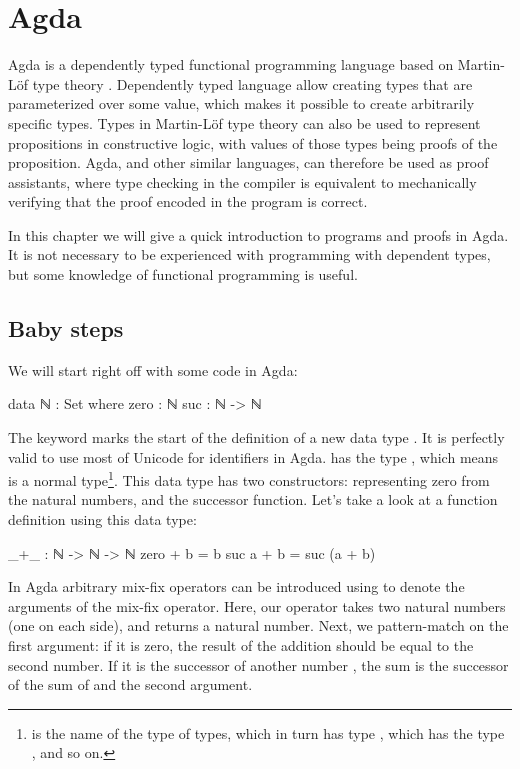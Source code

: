 
\chapter{Agda} \label{Agda}

	Agda is a dependently typed functional programming language based on
	Martin-Löf type theory \cite{?}. Dependently typed language allow creating
	types that are parameterized over some value, which makes it possible to
	create arbitrarily specific types. Types in Martin-Löf type theory can also
	be used to represent propositions in constructive logic, with values of
	those types being proofs of the proposition. Agda, and other similar
	languages, can therefore be used as proof assistants, where type checking
	in the compiler is equivalent to mechanically verifying that the proof
	encoded in the program is correct.

	In this chapter we will give a quick introduction to programs and proofs in
	Agda. It is not necessary to be experienced with programming with dependent
	types, but some knowledge of functional programming is useful.

	\section{Baby steps}

		We will start right off with some code in Agda:

		\begin{code}
			data ℕ : Set where
			  zero : ℕ
			  suc : ℕ -> ℕ
		\end{code}

		The keyword  marks the start of the definition of a new
		data type . It is perfectly valid to use most of Unicode for
		identifiers in Agda.  has the type , which means
		 is a normal type\footnote{ is the name of the
		type of types, which in turn has type , which has the type
		, and so on.}. This data type has two constructors:
		 representing zero from the natural numbers, and
		 the successor function.  Let's take a look at a function
		definition using this data type:

		\begin{code}
			_+_ : ℕ -> ℕ -> ℕ
			zero + b = b
			suc a + b = suc (a + b)
		\end{code}

		In Agda arbitrary mix-fix operators can be introduced using \codett{\_}
		to denote the arguments of the mix-fix operator. Here, our operator
		\codett{\_+\_} takes two natural numbers (one on each side), and
		returns a natural number. Next, we pattern-match on the first argument:
		if it is zero, the result of the addition should be equal to the second
		number. If it is the successor of another number , the sum is
		the successor of the sum of  and the second argument.

